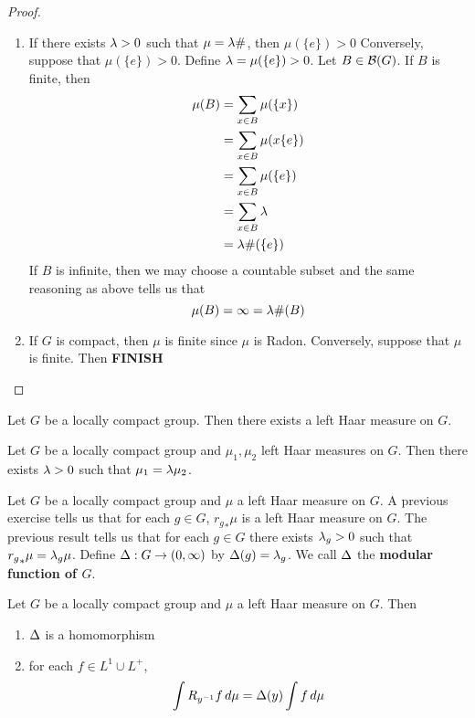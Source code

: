 \documentclass{book}
\begin{document}
	\begin{proof}\
		\begin{enumerate}
			\item If there exists $\lambda >0$ such that $\mu = \lambda \#$, then $\mu(\{e\}) > 0$ Conversely, suppose that $\mu(\{e\}) > 0$. Define $\lambda = \mu(\{e\}) > 0$. Let $B \in \mathcal{B}(G)$. If $B$ is finite, then 
			\begin{align*}
				\mu(B) 
				& = \sum\limits_{x \in B}  \mu(\{x\}) \\
				& = \sum\limits_{x \in B} \mu(x \{e\}) \\
				& = \sum\limits_{x \in B} \mu( \{e\}) \\
				& = \sum\limits_{x \in B} \lambda \\
				& = \lambda \#(\{e\})
			\end{align*}
			If $B$ is infinite, then we may choose a countable subset and the same reasoning as above tells us that $$\mu(B) = \infty = \lambda \#(B)$$
			\item If $G$ is compact, then $\mu$ is finite since $\mu$ is Radon. Conversely, suppose that $\mu$ is finite. Then \textbf{FINISH}
		\end{enumerate}
	\end{proof}
	
	\begin{thm}
		Let $G$ be a locally compact group. Then there exists a left Haar measure on $G$. 
	\end{thm}
	
	\begin{thm}
		Let $G$ be a locally compact group and $\mu_1, \mu_2$ left Haar measures on $G$. Then there exists $\lambda > 0$ such that $\mu_1 = \lambda \mu_2 $.
	\end{thm}
	
	\begin{defn}  
		Let $G$ be a locally compact group and $\mu$ a left Haar measure on $G$. A previous exercise tells us that for each $g \in G$, ${r_g}_*\mu$ is a left Haar measure on $G$. The previous result tells us that for each $g \in G$ there exists $\lambda_g >0$ such that ${r_g}_*\mu = \lambda_g \mu$. Define $\Delta: G \rightarrow (0, \infty)$ by $\Delta(g) = \lambda_g$. We call $\Delta$ the \textbf{modular function of $G$}. 
	\end{defn}

	\begin{ex}  
		Let $G$ be a locally compact group and $\mu$ a left Haar measure on $G$. Then 
		\begin{enumerate}
			\item $\Delta $ is a homomorphism 
			\item for each $f \in L^1 \cup L^+$, $$\int R_{y^{-1}} f \, d \mu = \Delta(y) \int f \, d \mu$$
		\end{enumerate}
	\end{ex}
\end{document}
